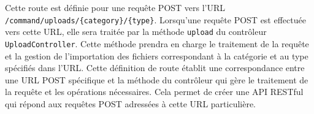 Cette route est définie pour une requête POST vers l'URL \Verb|/command/uploads/{category}/{type}|. Lorsqu'une requête POST est effectuée vers cette URL, elle sera traitée par la méthode \Verb|upload| du contrôleur \Verb|UploadController|. Cette méthode prendra en charge le traitement de la requête et la gestion de l'importation des fichiers correspondant à la catégorie et au type spécifiés dans l'URL. Cette définition de route établit une correspondance entre une URL POST spécifique et la méthode du contrôleur qui gère le traitement de la requête et les opérations nécessaires. Cela permet de créer une API RESTful qui répond aux requêtes POST adressées à cette URL particulière.


